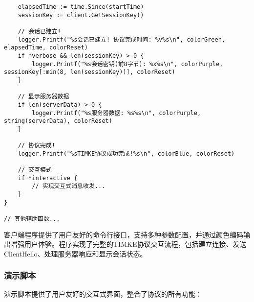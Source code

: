 \begin{verbatim}
    elapsedTime := time.Since(startTime)
    sessionKey := client.GetSessionKey()

    // 会话已建立!
    logger.Printf("%s会话已建立! 协议完成时间: %v%s\n", colorGreen, elapsedTime, colorReset)
    if *verbose && len(sessionKey) > 0 {
        logger.Printf("%s会话密钥(前8字节): %x%s\n", colorPurple, sessionKey[:min(8, len(sessionKey))], colorReset)
    }

    // 显示服务器数据
    if len(serverData) > 0 {
        logger.Printf("%s服务器数据: %s%s\n", colorPurple, string(serverData), colorReset)
    }

    // 协议完成!
    logger.Printf("%sTIMKE协议成功完成!%s\n", colorBlue, colorReset)

    // 交互模式
    if *interactive {
        // 实现交互式消息收发...
    }
}

// 其他辅助函数...
\end{verbatim}

客户端程序提供了用户友好的命令行接口，支持多种参数配置，并通过颜色编码输出增强用户体验。程序实现了完整的TIMKE协议交互流程，包括建立连接、发送ClientHello、处理服务器响应和显示会话状态。

\subsubsection{演示脚本}

演示脚本提供了用户友好的交互式界面，整合了协议的所有功能：

